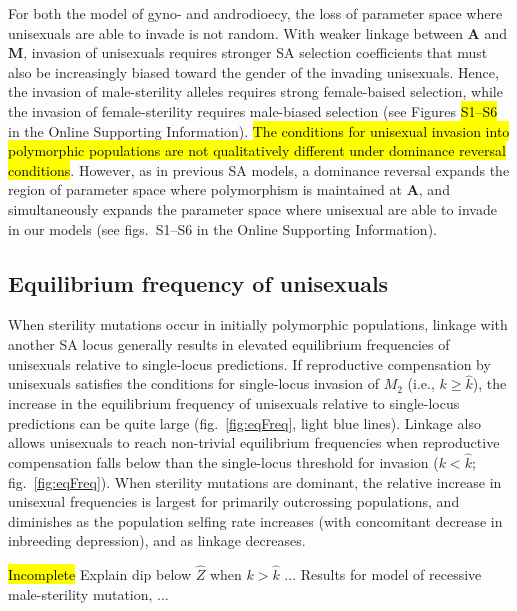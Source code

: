 \documentclass[9pt,twocolumn,twoside,lineno]{gsajnl}
\begin{document}
For both the model of gyno- and androdioecy, the loss of parameter space where unisexuals are able to invade is not random. With weaker linkage between $\mathbf{A}$ and $\mathbf{M}$, invasion of unisexuals requires stronger SA selection coefficients that must also be increasingly biased toward the gender of the invading unisexuals. Hence, the invasion of male-sterility alleles requires strong female-baised selection, while the invasion of female-sterility requires male-biased selection (see Figures \hl{S1--S6} in the Online Supporting Information). \hl{The conditions for unisexual invasion into polymorphic populations are not qualitatively different under dominance reversal conditions}. However, as in previous SA models, a dominance reversal expands the region of parameter space where polymorphism is maintained at $\mathbf{A}$, and simultaneously expands the parameter space where unisexual are able to invade in our models (see figs.~S1--S6 in the Online Supporting Information).


\subsection{Equilibrium frequency of unisexuals}

When sterility mutations occur in initially polymorphic populations, linkage with another SA locus generally results in elevated equilibrium frequencies of unisexuals relative to single-locus predictions. If reproductive compensation by unisexuals satisfies the conditions for single-locus invasion of $M_2$ (i.e., $k \geq \hat{k}$), the increase in the equilibrium frequency of unisexuals relative to single-locus predictions can be quite large (fig.~\ref{fig:eqFreq}, light blue lines). Linkage also allows unisexuals to reach non-trivial equilibrium frequencies when reproductive compensation falls below than the single-locus threshold for invasion ($k < \hat{k}$; fig.~\ref{fig:eqFreq}). When sterility mutations are dominant, the relative increase in unisexual frequencies is largest for primarily outcrossing populations, and diminishes as the population selfing rate increases (with concomitant decrease in inbreeding depression), and as linkage decreases. 

\hl{Incomplete} Explain dip below $\hat{Z}$ when $k > \hat{k}$ ... Results for model of recessive male-sterility mutation, ...
\end{document}
